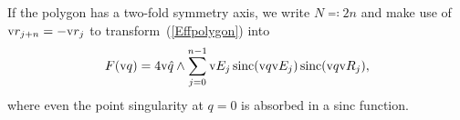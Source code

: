 If the polygon has a two-fold symmetry axis, we write $N\eqqcolon2n$
and make use of $\text{v}{r}_{j+n}=-\text{v}{r}_j$ to transform~(\ref{Effpolygon}) into
\begin{equation}\label{Effpolygon}
    F(\text{v}{q}) = \displaystyle 4\text{v}{\hat q}\wedge \sum_{j=0}^{n-1}
              \text{v}{E}_j \operatorname{sinc}(\text{v}{q}\text{v}{E}_j) \operatorname{sinc}(\text{v}{q}\text{v}{R}_j),
\end{equation}
where even the point singularity at $q=0$ is absorbed in a sinc function.

\iffalse
\section{Special functions near the removable singularity}

\index{Machine epsilon}
We assume a double-precision machine epsilon
of $\epsilon=2^{-52}\simeq2.2\cdot10^{-16}$.

\fi

